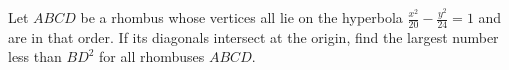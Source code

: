 Let $ABCD$ be a rhombus whose vertices all lie on the hyperbola $\tfrac{x^2}{20}-\tfrac{y^2}{24}=1$ and are in that order. If its diagonals intersect at the origin, find the largest number less than $BD^2$ for all rhombuses $ABCD$.
